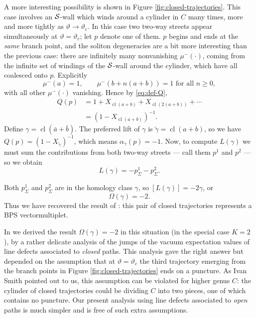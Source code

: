 \documentclass[11pt,a4paper]{article}
\def\cS {{\cal S}}
\newcommand{\ti}[1]{\textit{#1}}
\DeclareMathOperator{\cl}{{cl}}
\begin{document}
A more interesting possibility is shown in Figure \ref{fig:closed-trajectories}.  This case involves
an $\cS$-wall which winds around a cylinder in $C$ many times, more and more tightly as
$\vartheta \to \vartheta_c$.  In this case two two-way streets appear simultaneously at
$\vartheta = \vartheta_c$; let $p$ denote one of them.
$p$ begins and ends at the \ti{same} branch point, and the soliton degeneracies
are a bit more interesting than the previous case:  there are infinitely many
nonvanishing $\mu^-(\cdot)$,
coming from the infinite set of windings of the $\cS$-wall around the cylinder, which have all
coalesced onto $p$.  Explicitly
\begin{equation}
 \mu^-(a) = 1, \qquad \mu^-(b + n(a+b)) = 1 \text{ for all } n \ge 0,
\end{equation}
with all other $\mu^-(\cdot)$ vanishing.
Hence by \eqref{eq:def-Q},
\begin{align}
Q(p) &= 1 + X_{\cl(a+b)} + X_{\cl(2(a+b))} + \cdots \\
&= (1 - X_{\cl(a+b)})^{-1}.
\end{align}
Define $\gamma = \cl(\bar a + \bar b)$.
The preferred lift of $\gamma$ is $\tilde\gamma = \cl(a+b)$, so we have
$Q(p) = (1 - X_{\tilde\gamma})^{-1}$, which means $\alpha_\gamma(p) = -1$.
Now, to compute $L(\gamma)$ we must sum the contributions from both two-way streets ---
call them $p^1$ and $p^2$ --- so we obtain
\begin{equation}
 L(\gamma) = - p^1_\Sigma - p^2_\Sigma.
\end{equation}

Both $p^1_\Sigma$ and $p^2_\Sigma$ are in the homology class $\gamma$,
so $[L(\gamma)] = -2\gamma$, or
\begin{equation}
\Omega(\gamma) = -2.
\end{equation}
Thus we have recovered the result
of \cite{Klemm:1996bj,Gaiotto:2009hg}:  this pair of closed trajectories
represents a BPS vectormultiplet.

In \cite{Gaiotto:2009hg} we derived the result $\Omega(\gamma) = -2$ in
this situation (in the special case $K=2$),
by a rather delicate analysis of the jumps of the vacuum expectation
values of line defects associated to \ti{closed} paths.
This analysis gave the right answer but depended on the assumption that
at $\vartheta = \vartheta_c$ the third trajectory emerging from the branch points in Figure \ref{fig:closed-trajectories}
ends on a puncture. As
Ivan Smith pointed out to us, this assumption can be violated for higher genus $C$:  the cylinder
of closed trajectories could be dividing $C$ into two pieces, one of which contains no puncture.
Our present analysis using line defects associated to \ti{open} paths is much simpler and is free of such extra assumptions.
\end{document}
